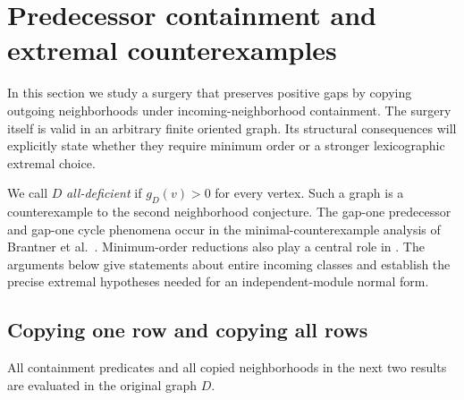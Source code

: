 \section{Predecessor containment and extremal counterexamples}
\label{sec:paper-predecessor-cloning}

In this section we study a surgery that preserves positive gaps by
copying outgoing neighborhoods under incoming-neighborhood containment.
The surgery itself is valid in an arbitrary finite oriented graph.
Its structural consequences will explicitly state whether they require
minimum order or a stronger lexicographic extremal choice.

We call $D$ \emph{all-deficient} if $g_D(v)>0$ for every vertex.
Such a graph is a counterexample to the second neighborhood conjecture.
The gap-one predecessor and gap-one cycle phenomena occur in the
minimal-counterexample analysis of Brantner et al.~\cite{BrantnerEtAl2009}.
Minimum-order reductions also play a central role in
\cite{EspunyDiazEtAl2025}. The arguments below give statements about
entire incoming classes and establish the precise extremal hypotheses
needed for an independent-module normal form.

\subsection{Copying one row and copying all rows}

All containment predicates and all copied neighborhoods in the next
two results are evaluated in the original graph $D$.

